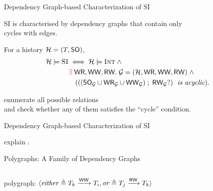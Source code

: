 \begin{frame}{Dependency Graph-based Characterization of SI}
	\begin{center}
		SI is characterised by dependency graphs that contain only \\[5pt]
		cycles with  edges.
	\end{center}

	\vspace{0.20cm}
  \begin{theorem}
		For a history \emph{$\mathcal{H} = (T, \textup{\textsf{SO}})$},
		\emph{\begin{align*}
			\mathcal{H} \models \textsc{SI} & \iff \mathcal{H} \models \textsc{Int} \;\land \\
				&\textcolor{red}{\exists}\; \textup{\textsf{WR}}, \textup{\textsf{WW}}, \textup{\textsf{RW}}.\; \mathcal{G} = (\mathcal{H}, \textup{\textsf{WR}}, \textup{\textsf{WW}}, \textup{\textsf{RW}}) \;\land \\
				&\quad (((\textup{\textsf{SO}}_{\mathcal{G}} \cup \textup{\textsf{WR}}_{\mathcal{G}} \cup \textup{\textsf{WW}}_{\mathcal{G}}) \;;\; \textup{\textsf{RW}}_{\mathcal{G}}?) \text{\it\; is acyclic}).
		\end{align*}}
  \end{theorem}

	\pause
	\vspace{0.20cm}
	\begin{center}
		enumerate all possible \red{$\WW$} relations \\[5pt]
		and check whether any of them satisfies the ``cycle'' condition.
	\end{center}
\end{frame}

\begin{frame}{Dependency Graph-based Characterization of SI}
  \begin{center}
		explain $\comp$
  \end{center}
\end{frame}

\begin{frame}{Polygraphs: A Family of Dependency Graphs}
	\pause
	\begin{columns}
		  \pause
	\end{columns}
	\pause
	\begin{center}
		polygraph: $\langle\mathit{either} \triangleq T_{k} \xrightarrow{\textup{\textsf{WW}}} T_{i},
		  \mathit{or} \triangleq T_{j} \xrightarrow{\textup{\textsf{RW}}} T_{k}\rangle$
	\end{center}
\end{frame}

